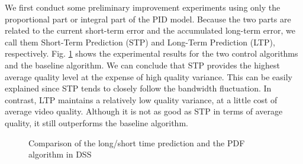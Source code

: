 \documentclass[journal,draftclsnofoot,onecolumn]{IEEEtran}
\begin{document}
We first conduct some preliminary improvement experiments using only the proportional part or integral part of the PID model. Because the two parts are related to the current short-term error and the accumulated long-term error, we call them Short-Term Prediction (STP) and Long-Term Prediction (LTP), respectively. Fig. \ref{fig:performance-all} shows the experimental results for the two control algorithms and the baseline algorithm. We can conclude that STP provides the highest average quality level at the expense of high quality variance. This can be easily explained since STP tends to closely follow the bandwidth fluctuation. In contrast, LTP maintains a relatively low quality variance, at a little cost of average video quality. Although it is not as good as STP in terms of average quality, it still outperforms the baseline algorithm.

\begin{figure}[t]
\centering
{}
\caption{Comparison of the long/short time prediction and the PDF algorithm in DSS}
\label{fig:performance-all}
\end{figure}
\end{document}
